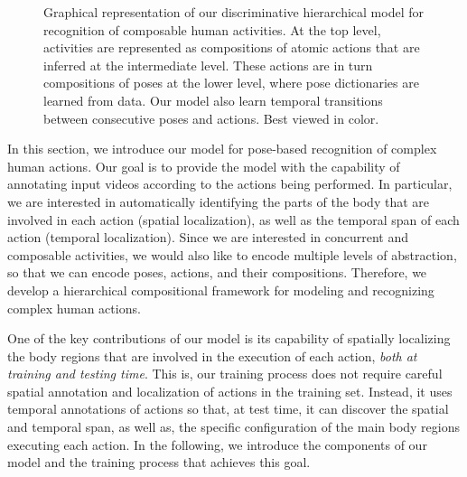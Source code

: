 \begin{figure}[tb]
\begin{center}
\fbox{\rule{0pt}{2in} \rule{0.9\linewidth}{0pt}}
\end{center}
\caption{Graphical representation of our discriminative hierarchical model for 
recognition of composable human activities.
At the top level, activities are represented as compositions of atomic actions that are inferred at
the intermediate level. These actions are in turn compositions of poses at the
lower level, where pose dictionaries are learned from data. Our model also learn
temporal transitions between consecutive poses and actions. Best viewed in
color.}
\label{fig:overview}

\end{figure}


In this section, we introduce our model for pose-based recognition of complex 
human actions. Our goal is to provide the model with the capability of 
annotating input videos according to the actions being performed. In 
particular, we are interested in automatically identifying the parts of the body 
that are involved in each action (spatial localization), as well as the temporal 
span of each action (temporal localization). Since we are interested in 
concurrent and composable activities, we would also like to encode multiple 
levels of abstraction, so that we can encode poses, actions, and their 
compositions. Therefore, we develop a hierarchical compositional framework for 
modeling and recognizing complex human actions.

One of the key contributions of our model is its capability of spatially 
localizing the body regions that are involved in the execution of each action, 
\emph{both at training and testing time}. This is, our training process does not 
require careful spatial annotation and localization of actions in the training 
set. Instead, it uses temporal annotations of actions so 
that, at test time, it can discover the spatial and temporal span, as well as, 
the specific configuration of the main body regions executing each action. In 
the following, we introduce the components of our model and the training 
process that achieves this goal.

